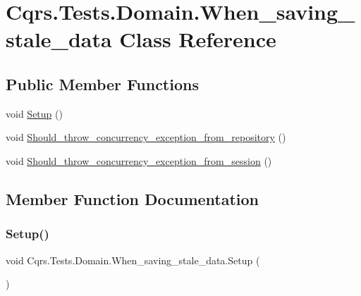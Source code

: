 \hypertarget{classCqrs_1_1Tests_1_1Domain_1_1When__saving__stale__data}{}\section{Cqrs.\+Tests.\+Domain.\+When\+\_\+saving\+\_\+stale\+\_\+data Class Reference}
\label{classCqrs_1_1Tests_1_1Domain_1_1When__saving__stale__data}
\subsection*{Public Member Functions}
\begin{DoxyCompactItemize}
\item 
void \hyperlink{classCqrs_1_1Tests_1_1Domain_1_1When__saving__stale__data_a69d264e3f5981aca77b3523c7ca7a510}{Setup} ()
\item 
void \hyperlink{classCqrs_1_1Tests_1_1Domain_1_1When__saving__stale__data_a6d2f729c473fd0d44db49979b64fbcde}{Should\+\_\+throw\+\_\+concurrency\+\_\+exception\+\_\+from\+\_\+repository} ()
\item 
void \hyperlink{classCqrs_1_1Tests_1_1Domain_1_1When__saving__stale__data_af768e1143a492a82adabdd21e741525f}{Should\+\_\+throw\+\_\+concurrency\+\_\+exception\+\_\+from\+\_\+session} ()
\end{DoxyCompactItemize}


\subsection{Member Function Documentation}
\mbox{\label{classCqrs_1_1Tests_1_1Domain_1_1When__saving__stale__data_a69d264e3f5981aca77b3523c7ca7a510}} 
\subsubsection{\texorpdfstring{Setup()}{Setup()}}
{\footnotesize\ttfamily void Cqrs.\+Tests.\+Domain.\+When\+\_\+saving\+\_\+stale\+\_\+data.\+Setup (\begin{DoxyParamCaption}{ }\end{DoxyParamCaption})}

